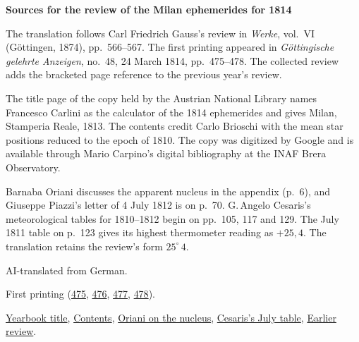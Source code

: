 \clearpage\thispagestyle{empty}
\begin{center}\Large\bfseries Sources for the review of the Milan ephemerides for 1814\end{center}

The translation follows Carl Friedrich Gauss’s review in \emph{Werke}, vol.~VI (Göttingen, 1874), pp.~566--567. The first printing appeared in \emph{Göttingische gelehrte Anzeigen}, no.~48, 24 March 1814, pp.~475--478. The collected review adds the bracketed page reference to the previous year’s review.

The title page of the copy held by the Austrian National Library names Francesco Carlini as the calculator of the 1814 ephemerides and gives Milan, Stamperia Reale, 1813. The contents credit Carlo Brioschi with the mean star positions reduced to the epoch of 1810. The copy was digitized by Google and is available through Mario Carpino’s digital bibliography at the INAF Brera Observatory.

Barnaba Oriani discusses the apparent nucleus in the appendix (p.~6), and Giuseppe Piazzi’s letter of 4 July 1812 is on p.~70. G.\,Angelo Cesaris’s meteorological tables for 1810--1812 begin on pp.~105, 117 and 129. The July 1811 table on p.~123 gives its highest thermometer reading as $+25{,}4$. The translation retains the review’s form $25^\circ\,4$.

AI-translated from German.

First printing (\href{https://images.p.sub.uni-goettingen.de/iiif/image/gdz:PPN319721507_1814:00000477/full/1650,/0/default.jpg}{475}, \href{https://images.p.sub.uni-goettingen.de/iiif/image/gdz:PPN319721507_1814:00000478/full/1650,/0/default.jpg}{476}, \href{https://images.p.sub.uni-goettingen.de/iiif/image/gdz:PPN319721507_1814:00000479/full/1650,/0/default.jpg}{477}, \href{https://images.p.sub.uni-goettingen.de/iiif/image/gdz:PPN319721507_1814:00000480/full/1650,/0/default.jpg}{478}).

\href{https://www1.brera.inaf.it/~mario.carpino/Biblioteca_Digitale/Effemeridi_Milano/mirror/EM1814b.pdf#page=6}{Yearbook title}, \href{https://www1.brera.inaf.it/~mario.carpino/Biblioteca_Digitale/Effemeridi_Milano/mirror/EM1814b.pdf#page=12}{Contents}, \href{https://www1.brera.inaf.it/~mario.carpino/Biblioteca_Digitale/Effemeridi_Milano/mirror/EM1814b.pdf#page=139}{Oriani on the nucleus}, \href{https://www1.brera.inaf.it/~mario.carpino/Biblioteca_Digitale/Effemeridi_Milano/mirror/EM1814b.pdf#page=256}{Cesaris’s July table}, \href{https://images.p.sub.uni-goettingen.de/iiif/image/gdz:PPN319721507_1813:00000949/full/1650,/0/default.jpg}{Earlier review}.

\clearpage
